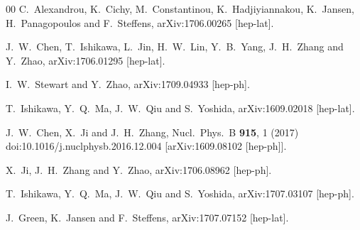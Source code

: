 \begin{thebibliography}{00}
	C.~Alexandrou, K.~Cichy, M.~Constantinou, K.~Hadjiyiannakou, K.~Jansen, H.~Panagopoulos and F.~Steffens,
	arXiv:1706.00265 [hep-lat].


	J.~W.~Chen, T.~Ishikawa, L.~Jin, H.~W.~Lin, Y.~B.~Yang, J.~H.~Zhang and Y.~Zhao,
	arXiv:1706.01295 [hep-lat].



	I.~W.~Stewart and Y.~Zhao,
	arXiv:1709.04933 [hep-ph].


	T.~Ishikawa, Y.~Q.~Ma, J.~W.~Qiu and S.~Yoshida,
	arXiv:1609.02018 [hep-lat].


	J.~W.~Chen, X.~Ji and J.~H.~Zhang,
	Nucl.\ Phys.\ B {\bf 915}, 1 (2017)
	doi:10.1016/j.nuclphysb.2016.12.004
	[arXiv:1609.08102 [hep-ph]].


	X.~Ji, J.~H.~Zhang and Y.~Zhao,
	arXiv:1706.08962 [hep-ph].


	T.~Ishikawa, Y.~Q.~Ma, J.~W.~Qiu and S.~Yoshida,
	arXiv:1707.03107 [hep-ph].

	J.~Green, K.~Jansen and F.~Steffens,
	arXiv:1707.07152 [hep-lat].



\end{thebibliography}
